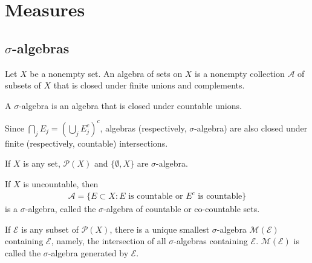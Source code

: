\setchapterpreamble[u]{\margintoc}
\chapter{Measures}

\section{\texorpdfstring{$\sigma$}{sigma}-algebras}

\begin{definition}[Algebra]
    Let $X$ be a nonempty set.
    An algebra of sets on $X$ is a nonempty collection $\mathcal{A}$ of subsets of $X$ that is closed under finite unions and complements.
\end{definition}

\begin{definition}
    A $\sigma$-algebra is an algebra that is closed under countable unions.
\end{definition}

Since $\bigcap_{j} E_j = (\bigcup_{j} E_j^c)^c$, algebras (respectively, $\sigma$-algebra) are also closed under finite (respectively, countable) intersections.

\begin{example}
    If $X$ is any set, $\mathcal{P}(X)$ and $\{ \emptyset, X \}$ are $\sigma$-algebra.
\end{example}

\begin{example}
    If $X$ is uncountable, then
    \begin{align}
        \mathcal{A} = \{ E \subset X : E \text{ is countable or } E^{c} \text{ is countable} \}
    \end{align}
    is a $\sigma$-algebra, called the $\sigma$-algebra of countable or co-countable sets.
\end{example}

\begin{definition}
    If $\mathcal{E}$ is any subset of $\mathcal{P}(X)$, there is a unique smallest $\sigma$-algebra $\mathcal{M}(\mathcal{E})$ containing $\mathcal{E}$, namely, the intersection of all $\sigma$-algebras containing $\mathcal{E}$.
    $\mathcal{M}(\mathcal{E})$ is called the $\sigma$-algebra generated by $\mathcal{E}$.
\end{definition}

